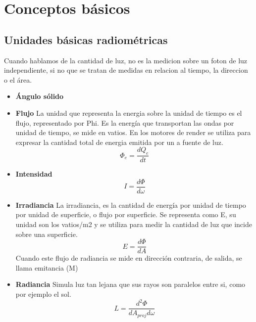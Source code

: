 \chapter{Conceptos b\'asicos}

\section{Unidades b\'asicas radiom\'etricas}

\bgroup
    Cuando hablamos de la cantidad de luz, no es la medicion sobre un foton de luz independiente, si no que se tratan de medidas en relacion
    al tiempo, la direccion o el \'area.

    \begin{itemize}
    \item[] \textbf {{\'Angulo s\'olido}}
    \item[] \textbf {Flujo} La unidad que representa la energia sobre la unidad de tiempo es el flujo, representado por Phi. Es la energía que transportan las ondas
    por unidad de tiempo, se mide en vatios. En los motores de render se utiliza para expresar la cantidad total de energia emitida por un a fuente de luz.
    \begin{equation}
        \Phi_e = \dfrac{d{Q_e}}{dt}
    \end{equation}
    \item[] \textbf {Intensidad}
    \begin{equation}
        I = \dfrac{d\Phi}{d\omega}
    \end{equation} 
    \item[] \textbf {Irradiancia} La irradiancia, es la cantidad de energ\'ia por unidad de tiempo por unidad de superficie, o flujo por superficie. Se representa como
    E, su unidad son los vatios/m2 y se utiliza para medir la cantidad de luz que incide sobre una superficie.
    \begin{equation}
        E = \dfrac{d\Phi}{dA}
    \end{equation}
    Cuando este flujo de radiancia se mide en direcci\'on contraria, de salida, se llama emitancia (M)
    \item[] \textbf {Radiancia} Simula luz tan lejana que sus rayos son paralelos entre si, como por ejemplo el sol.
    \begin{equation}
        L = \dfrac{d^2\Phi}{dA_{proj}d\omega}
    \end{equation}
    \end{itemize}
\egroup

